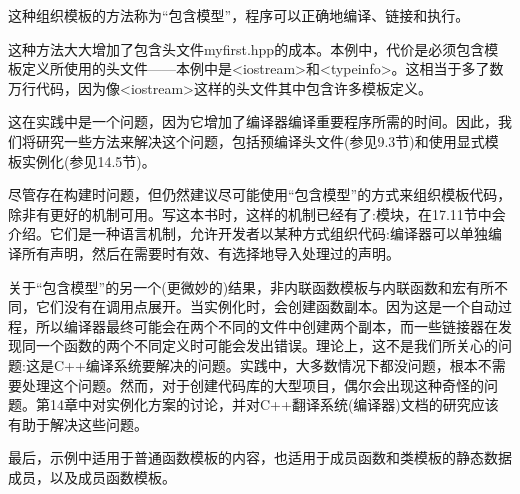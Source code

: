 这种组织模板的方法称为“包含模型”，程序可以正确地编译、链接和执行。

这种方法大大增加了包含头文件myfirst.hpp的成本。本例中，代价是必须包含模板定义所使用的头文件——本例中是<iostream>和<typeinfo>。这相当于多了数万行代码，因为像<iostream>这样的头文件其中包含许多模板定义。

这在实践中是一个问题，因为它增加了编译器编译重要程序所需的时间。因此，我们将研究一些方法来解决这个问题，包括预编译头文件(参见9.3节)和使用显式模板实例化(参见14.5节)。

尽管存在构建时问题，但仍然建议尽可能使用“包含模型”的方式来组织模板代码，除非有更好的机制可用。写这本书时，这样的机制已经有了:模块，在17.11节中会介绍。它们是一种语言机制，允许开发者以某种方式组织代码:编译器可以单独编译所有声明，然后在需要时有效、有选择地导入处理过的声明。

关于“包含模型”的另一个(更微妙的)结果，非内联函数模板与内联函数和宏有所不同，它们没有在调用点展开。当实例化时，会创建函数副本。因为这是一个自动过程，所以编译器最终可能会在两个不同的文件中创建两个副本，而一些链接器在发现同一个函数的两个不同定义时可能会发出错误。理论上，这不是我们所关心的问题:这是C++编译系统要解决的问题。实践中，大多数情况下都没问题，根本不需要处理这个问题。然而，对于创建代码库的大型项目，偶尔会出现这种奇怪的问题。第14章中对实例化方案的讨论，并对C++翻译系统(编译器)文档的研究应该有助于解决这些问题。

最后，示例中适用于普通函数模板的内容，也适用于成员函数和类模板的静态数据成员，以及成员函数模板。












